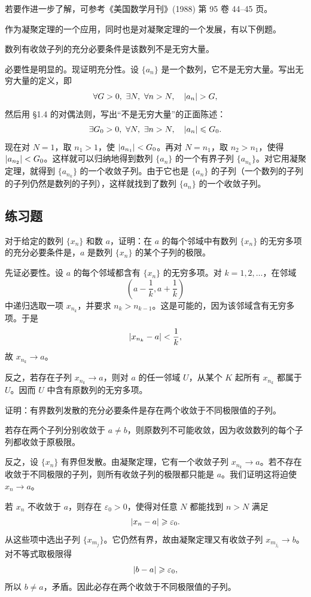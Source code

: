 \begin{xremark}
若要作进一步了解，可参考《美国数学月刊》(1988) 第 95 卷 44--45 页。
\end{xremark}

作为凝聚定理的一个应用，同时也是对凝聚定理的一个发展，有以下例题。

\begin{xexample}[3.3.2]
数列有收敛子列的充分必要条件是该数列不是无穷大量。
\end{xexample}
\begin{xproof}
必要性是明显的。现证明充分性。设 $\{a_n\}$ 是一个数列，它不是无穷大量。写出无穷大量的定义，即
\[
  \forall G>0,\ \exists N,\ \forall n>N,\quad \lvert a_n\rvert>G,
\]
然后用 §1.4 的对偶法则，写出“不是无穷大量”的正面陈述：
\[
  \exists G_0>0,\ \forall N,\ \exists n>N,\quad \lvert a_n\rvert\leqslant G_0.
\]
现在对 $N=1$，取 $n_1>1$，使 $\lvert a_{n_1}\rvert<G_0$。再对 $N=n_1$，取 $n_2>n_1$，使得 $\lvert a_{n_2}\rvert<G_0$。这样就可以归纳地得到数列 $\{a_n\}$ 的一个有界子列 $\{a_{n_k}\}$。对它用凝聚定理，就得到 $\{a_{n_k}\}$ 的一个收敛子列。由于它也是 $\{a_n\}$ 的子列（一个数列的子列的子列仍然是数列的子列），这样就找到了数列 $\{a_n\}$ 的一个收敛子列。
\end{xproof}

\subsection{练习题}

\begin{xexercise}[1]
对于给定的数列 $\{x_n\}$ 和数 $a$，证明：在 $a$ 的每个邻域中有数列 $\{x_n\}$ 的无穷多项的充分必要条件是，$a$ 是数列 $\{x_n\}$ 的某个子列的极限。
\end{xexercise}
\begin{xsolution}
先证必要性。设 $a$ 的每个邻域都含有 $\{x_n\}$ 的无穷多项。对 $k=1,2,\ldots$，在邻域
\[
  \left(a-\frac1k,a+\frac1k\right)
\]
中递归选取一项 $x_{n_k}$，并要求 $n_k>n_{k-1}$。这是可能的，因为该邻域含有无穷多项。于是
\[
  \lvert x_{n_k}-a\rvert<\frac1k,
\]
故 $x_{n_k}\to a$。

反之，若存在子列 $x_{n_k}\to a$，则对 $a$ 的任一邻域 $U$，从某个 $K$ 起所有 $x_{n_k}$ 都属于 $U$。因而 $U$ 中含有原数列的无穷多项。
\end{xsolution}


\begin{xexercise}[2]
证明：有界数列发散的充分必要条件是存在两个收敛于不同极限值的子列。
\end{xexercise}
\begin{xsolution}
若存在两个子列分别收敛于 $a\neq b$，则原数列不可能收敛，因为收敛数列的每个子列都收敛于原极限。

反之，设 $\{x_n\}$ 有界但发散。由凝聚定理，它有一个收敛子列 $x_{n_k}\to a$。若不存在收敛于不同极限的子列，则所有收敛子列的极限都只能是 $a$。我们证明这将迫使 $x_n\to a$。

若 $x_n$ 不收敛于 $a$，则存在 $\varepsilon_0>0$，使得对任意 $N$ 都能找到 $n>N$ 满足
\[
  \lvert x_n-a\rvert\geqslant\varepsilon_0.
\]
从这些项中选出子列 $\{x_{m_j}\}$。它仍然有界，故由凝聚定理又有收敛子列 $x_{m_{j_l}}\to b$。对不等式取极限得
\[
  \lvert b-a\rvert\geqslant\varepsilon_0,
\]
所以 $b\neq a$，矛盾。因此必存在两个收敛于不同极限值的子列。
\end{xsolution}


